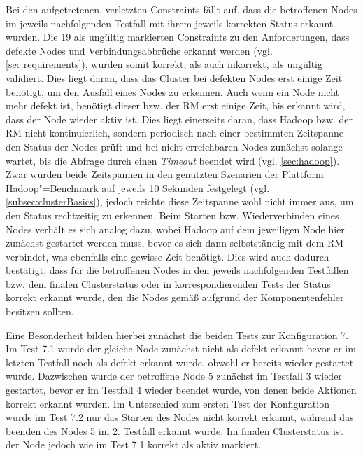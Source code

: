 Bei den aufgetretenen, verletzten Constraints fällt auf, dass die betroffenen Nodes im jeweils nachfolgenden Testfall mit ihrem jeweils korrekten Status erkannt wurden.
Die 19 als ungültig markierten Constraints zu den Anforderungen, dass defekte Nodes und Verbindungsabbrüche erkannt werden (vgl. \cref{sec:requirements}), wurden somit korrekt, als auch inkorrekt, als ungültig validiert.
Dies liegt daran, dass das Cluster bei defekten Nodes erst einige Zeit benötigt, um den Ausfall eines Nodes zu erkennen.
Auch wenn ein Node nicht mehr defekt ist, benötigt dieser bzw. der \gls{RM} erst einige Zeit, bis erkannt wird, dass der Node wieder aktiv ist.
Dies liegt einerseits daran, dass Hadoop bzw. der \gls{RM} nicht kontinuierlich, sondern periodisch nach einer bestimmten Zeitspanne den Status der Nodes prüft und bei nicht erreichbaren Nodes zunächst solange wartet, bis die Abfrage durch einen \emph{Timeout} beendet wird (vgl. \cref{sec:hadoop}).
Zwar wurden beide Zeitspannen in den genutzten Szenarien der Plattform Hadoop"=Benchmark auf jeweils 10 Sekunden festgelegt (vgl. \cref{subsec:clusterBasics}), jedoch reichte diese Zeitspanne wohl nicht immer aus, um den Status rechtzeitig zu erkennen.
Beim Starten bzw. Wiederverbinden eines Nodes verhält es sich analog dazu, wobei Hadoop auf dem jeweiligen Node hier zunächst gestartet werden muss, bevor es sich dann selbstständig mit dem \gls{RM} verbindet, was ebenfalls eine gewisse Zeit benötigt.
Dies wird auch dadurch bestätigt, dass für die betroffenen Nodes in den jeweils nachfolgenden Testfällen bzw. dem finalen Clusterstatus oder in korrespondierenden Tests der Status korrekt erkannt wurde, den die Nodes gemäß aufgrund der Komponentenfehler besitzen sollten.

Eine Besonderheit bilden hierbei zunächst die beiden Tests zur Konfiguration 7.
Im Test 7.1 wurde der gleiche Node zunächst nicht als defekt erkannt bevor er im letzten Testfall noch als defekt erkannt wurde, obwohl er bereits wieder gestartet wurde.
Dazwischen wurde der betroffene Node 5 zunächst im Testfall 3 wieder gestartet, bevor er im Testfall 4 wieder beendet wurde, von denen beide Aktionen korrekt erkannt wurden.
Im Unterschied zum ersten Test der Konfiguration wurde im Test 7.2 nur das Starten des Nodes nicht korrekt erkannt, während das beenden des Nodes 5 im 2. Testfall erkannt wurde.
Im finalen Clusterstatus ist der Node jedoch wie im Test 7.1 korrekt als aktiv markiert.

